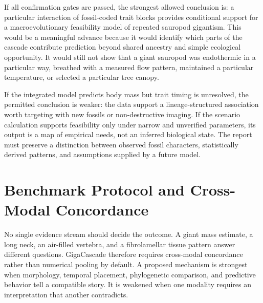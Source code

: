 \documentclass[conference]{IEEEtran}
\newcommand{\gc}{GigaCascade}
\begin{document}
If all confirmation gates are passed, the strongest allowed conclusion is: a particular interaction of fossil-coded trait blocks provides conditional support for a macroevolutionary feasibility model of repeated sauropod gigantism. This would be a meaningful advance because it would identify which parts of the cascade contribute prediction beyond shared ancestry and simple ecological opportunity. It would still not show that a giant sauropod was endothermic in a particular way, breathed with a measured flow pattern, maintained a particular temperature, or selected a particular tree canopy.

If the integrated model predicts body mass but trait timing is unresolved, the permitted conclusion is weaker: the data support a lineage-structured association worth targeting with new fossils or non-destructive imaging. If the scenario calculation supports feasibility only under narrow and unverified parameters, its output is a map of empirical needs, not an inferred biological state. The report must preserve a distinction between observed fossil characters, statistically derived patterns, and assumptions supplied by a future model.

\section{Benchmark Protocol and Cross-Modal Concordance}

No single evidence stream should decide the outcome. A giant mass estimate, a long neck, an air-filled vertebra, and a fibrolamellar tissue pattern answer different questions. \gc{} therefore requires cross-modal concordance rather than numerical pooling by default. A proposed mechanism is strongest when morphology, temporal placement, phylogenetic comparison, and predictive behavior tell a compatible story. It is weakened when one modality requires an interpretation that another contradicts.
\end{document}

